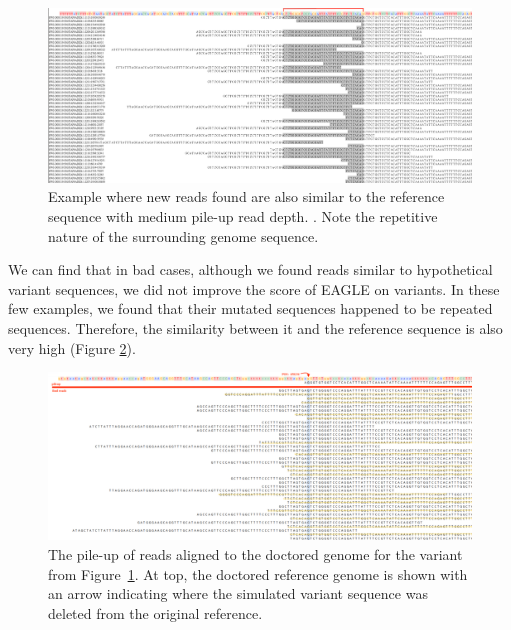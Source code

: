 \begin{figure}[H]
\includegraphics[width=1\columnwidth]{body/image/mid_new_REFread.png}
\caption[New reads are similar to the reference with medium pile-up read depth]
{Example where new reads found are also similar to the reference sequence with medium pile-up read depth.
\ExplainRedBracket.
Note the repetitive nature of the surrounding genome sequence.}
\label{mid_new_REFread}
\end{figure}

We can find that in bad cases, although we found reads similar to hypothetical variant sequences, we did not improve the score of EAGLE on variants. In these few examples, we found that their mutated sequences happened to be repeated sequences. Therefore, the similarity between it and the reference sequence is also very high (Figure \ref{mid_pileup_REFread}).


\begin{figure}[H]
\includegraphics[width=1\columnwidth]{body/image/mid_pileup_REFread.png}
\caption[pileup with Figure~\ref{mid_new_REFread}]
{The pile-up of reads aligned to the doctored genome for the variant from Figure~\ref{mid_new_REFread}.
At top, the doctored reference genome is shown with an arrow indicating where the simulated variant sequence was deleted from the original reference.}
\label{mid_pileup_REFread}
\end{figure}


